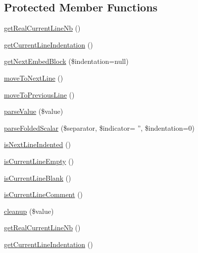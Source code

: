 \subsection*{Protected Member Functions}
\begin{DoxyCompactItemize}
\item 
\hyperlink{class_symfony_1_1_components_1_1_yaml_1_1_parser_afed732413dcd90e7e27f15f9a693a933}{getRealCurrentLineNb} ()
\item 
\hyperlink{class_symfony_1_1_components_1_1_yaml_1_1_parser_afab1ea78369d49700e8269645a560ebe}{getCurrentLineIndentation} ()
\item 
\hyperlink{class_symfony_1_1_components_1_1_yaml_1_1_parser_a094d72cd70df641bbb7c4d87647e7afe}{getNextEmbedBlock} (\$indentation=null)
\item 
\hyperlink{class_symfony_1_1_components_1_1_yaml_1_1_parser_a23295181488f2269374ba055ab73f133}{moveToNextLine} ()
\item 
\hyperlink{class_symfony_1_1_components_1_1_yaml_1_1_parser_a793efbbdb80289712c6d8b13974a0794}{moveToPreviousLine} ()
\item 
\hyperlink{class_symfony_1_1_components_1_1_yaml_1_1_parser_a090d97f0d830c8a3a6d4962636b9081b}{parseValue} (\$value)
\item 
\hyperlink{class_symfony_1_1_components_1_1_yaml_1_1_parser_aca51709db86f3336fa0cd8773cc791d0}{parseFoldedScalar} (\$separator, \$indicator= '', \$indentation=0)
\item 
\hyperlink{class_symfony_1_1_components_1_1_yaml_1_1_parser_a007cdf42dc438be788d23206f14e7396}{isNextLineIndented} ()
\item 
\hyperlink{class_symfony_1_1_components_1_1_yaml_1_1_parser_ae7bb7c2fd370a72c6f119b53ee64eb82}{isCurrentLineEmpty} ()
\item 
\hyperlink{class_symfony_1_1_components_1_1_yaml_1_1_parser_a071146be0626e2ff9537f3b741b511d6}{isCurrentLineBlank} ()
\item 
\hyperlink{class_symfony_1_1_components_1_1_yaml_1_1_parser_af9c00798454b2a4b7c360c3bba9f6b10}{isCurrentLineComment} ()
\item 
\hyperlink{class_symfony_1_1_components_1_1_yaml_1_1_parser_a6d462f56da02d7670e368941d918f074}{cleanup} (\$value)
\item 
\hyperlink{class_symfony_1_1_components_1_1_yaml_1_1_parser_afed732413dcd90e7e27f15f9a693a933}{getRealCurrentLineNb} ()
\item 
\hyperlink{class_symfony_1_1_components_1_1_yaml_1_1_parser_afab1ea78369d49700e8269645a560ebe}{getCurrentLineIndentation} ()

\end{DoxyCompactItemize}
